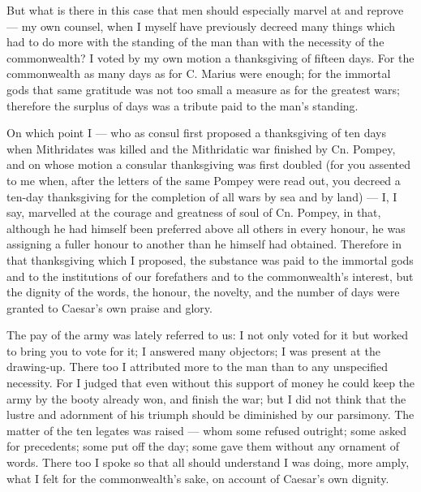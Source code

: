  But what is there in this case that men should especially marvel at and reprove --- my own counsel, when I myself have previously decreed many things which had to do more with the standing of the man than with the necessity of the commonwealth? I voted by my own motion a thanksgiving of fifteen days. For the commonwealth as many days as for C. Marius were enough; for the immortal gods that same gratitude was not too small a measure as for the greatest wars; therefore the surplus of days was a tribute paid to the man's standing.

 On which point I --- who as consul first proposed a thanksgiving of ten days when Mithridates was killed and the Mithridatic war finished by Cn. Pompey, and on whose motion a consular thanksgiving was first doubled (for you assented to me when, after the letters of the same Pompey were read out, you decreed a ten-day thanksgiving for the completion of all wars by sea and by land) --- I, I say, marvelled at the courage and greatness of soul of Cn. Pompey, in that, although he had himself been preferred above all others in every honour, he was assigning a fuller honour to another than he himself had obtained. Therefore in that thanksgiving which I proposed, the substance was paid to the immortal gods and to the institutions of our forefathers and to the commonwealth's interest, but the dignity of the words, the honour, the novelty, and the number of days were granted to Caesar's own praise and glory.

 The pay of the army was lately referred to us: I not only voted for it but worked to bring you to vote for it; I answered many objectors; I was present at the drawing-up. There too I attributed more to the man than to any unspecified necessity. For I judged that even without this support of money he could keep the army by the booty already won, and finish the war; but I did not think that the lustre and adornment of his triumph should be diminished by our parsimony. The matter of the ten legates was raised --- whom some refused outright; some asked for precedents; some put off the day; some gave them without any ornament of words. There too I spoke so that all should understand I was doing, more amply, what I felt for the commonwealth's sake, on account of Caesar's own dignity.

